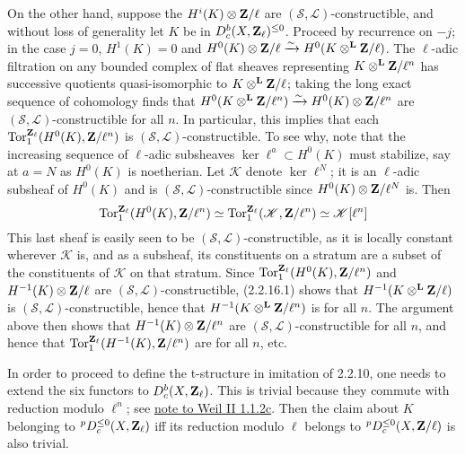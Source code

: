 \documentclass[deligne.tex]{subfiles}
\begin{document}
	On the other hand, suppose the $H^i(K)\otimes\mathbf{Z}/\ell$ are
	$(\mathcal S,\mathcal L)$-constructible, and without loss of generality 
	let $K$ be in $D_c^b(X,\mathbf{Z}_\ell)^{\leq 0}$. Proceed by recurrence on
	$-j$; in the case $j=0$, $H^1(K)=0$ and
	$H^0(K)\otimes\mathbf{Z}/\ell\xrightarrow\sim H^0(K\otimes^{\mathbf{L}}\mathbf{Z}/\ell)$. The $\ell$-adic
	filtration on any bounded complex of flat sheaves representing
	$K\otimes^{\mathbf{L}}\mathbf{Z}/\ell^n$ has successive quotients quasi-isomorphic to
	$K\otimes^{\mathbf{L}}\mathbf{Z}/\ell$; taking the long exact sequence of cohomology finds
	that $H^0(K\otimes^{\mathbf{L}}\mathbf{Z}/\ell^n)\xrightarrow\sim H^0(K)\otimes\mathbf{Z}/\ell^n$ are
	$(\mathcal S,\mathcal L)$-constructible for all $n$.
	In particular, this implies that each
	$\operatorname{Tor}_1^{\mathbf{Z}_\ell}(H^0(K),\mathbf{Z}/\ell^n)$ is
	$(\mathcal S,\mathcal L)$-constructible.
	To see why, note that the increasing sequence of $\ell$-adic subsheaves
	$\ker\ell^a\subset H^0(K)$ must stabilize, say at $a=N$ as $H^0(K)$ is
	noetherian. Let $\mathscr K$ denote $\ker \ell^N$; it is an $\ell$-adic 
	subsheaf of $H^0(K)$ and is $(\mathcal S,\mathcal L)$-constructible
	since $H^0(K)\otimes\mathbf{Z}/\ell^N$ is. Then
	\begin{equation*}
		\operatorname{Tor}^{\mathbf{Z}_\ell}_1(H^0(K),\mathbf{Z}/\ell^n)
		\simeq\operatorname{Tor}^{\mathbf{Z}_\ell}_1(\mathscr K,\mathbf{Z}/\ell^n)
		\simeq\mathscr K[\ell^n]
	\end{equation*}
	This last sheaf is easily seen to be
	$(\mathcal S,\mathcal L)$-constructible, as it is locally constant
	wherever $\mathscr K$ is, and as a subsheaf, its constituents on a
	stratum are a subset of the constituents of $\mathscr K$ on that stratum.
	Since $\operatorname{Tor}^{\mathbf{Z}_\ell}_1(H^0(K),\mathbf{Z}/\ell^n)$ and
	$H^{-1}(K)\otimes\mathbf{Z}/\ell$ are
	$(\mathcal S,\mathcal L)$-constructible, (2.2.16.1)
	shows that $H^{-1}(K\otimes^{\mathbf{L}}\mathbf{Z}/\ell)$ is
	$(\mathcal S,\mathcal L)$-constructible, hence that
	$H^{-1}(K\otimes^{\mathbf{L}}\mathbf{Z}/\ell^n)$ is for all $n$. 
	The argument above then shows that $H^{-1}(K)\otimes\mathbf{Z}/\ell^n$ are
	$(\mathcal S,\mathcal L)$-constructible for all $n$, and hence
	that $\operatorname{Tor}_1^{\mathbf{Z}_\ell}(H^{-1}(K),\mathbf{Z}/\ell^n)$ are for all $n$, etc.
	
	In order to proceed to define the t-structure in imitation of 2.2.10,
	one needs to extend the six functors to $D_c^b(X,\mathbf{Z}_\ell)$. This is
	trivial because they commute with reduction modulo $\ell^n$; see
	\hyperref[weilII:1.1.2c]{note to Weil II 1.1.2c}.
	Then the claim about $K$ belonging to $^pD_c^{\leq0}(X,\mathbf{Z}_\ell)$ iff
	its reduction modulo $\ell$ belongs to $^pD_c^{\leq0}(X,\mathbf{Z}/\ell)$ is
	also trivial.
	
\end{document}
